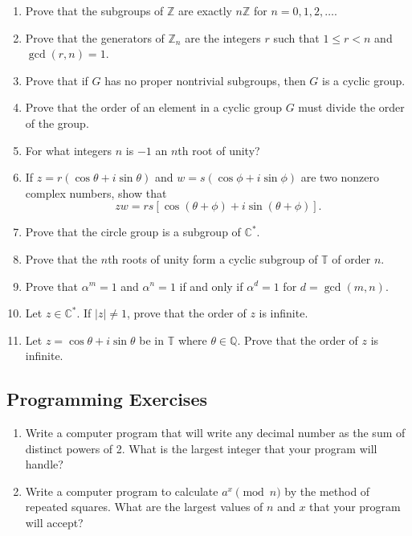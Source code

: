 {\begin{enumerate}
 
\item
Prove that the subgroups of ${\mathbb Z}$ are exactly $n{\mathbb Z}$ for $n
= 0, 1, 2, \ldots$. 
 
 
\item
Prove that the generators of ${\mathbb Z}_n$ are the integers $r$ such
that $1 \leq r < n$ and $\gcd(r,n) =  1$. 
 
 
\item
Prove that if $G$ has no proper nontrivial subgroups, then $G$ is a 
cyclic group.
 
 
 
\item
Prove that the order of an element in a cyclic group $G$ must divide
the order of the  group. 
 
 
\item
For what integers $n$ is $-1$ an $n$th root of unity?
 
 
\item
If $z = r( \cos \theta + i \sin \theta)$ and $w = s(\cos \phi + i \sin
\phi)$ are two nonzero complex numbers, show that
\[
zw = rs[ \cos( \theta + \phi)  + i \sin( \theta + \phi)].
\]
 
 
\item
Prove that the circle group is a subgroup of  ${\mathbb C}^*$.
 
 
\item
Prove that the $n$th roots of unity form a cyclic subgroup of ${\mathbb
T}$  of order $n$. 
 
 
\item
Prove that $\alpha^m =1$ and $\alpha^n = 1$ if and only if $\alpha^d = 1$
for $d = \gcd(m,n)$.
 
 
\item
Let $z \in {\mathbb C}^\ast$. If $|z| \neq 1$, prove that the order of
$z$ is infinite. 
 
 
\item
Let $z =\cos \theta + i \sin \theta$ be in ${\mathbb T}$ where $\theta
\in {\mathbb Q}$.  Prove that the order of $z$ is infinite.
 
\end{enumerate}
}
 
 
\subsection*{Programming Exercises}
 
 
{\small
\begin{enumerate}
 
 
\item
Write a computer program that will write any decimal number as the sum
of distinct powers of 2.  What is the largest integer that your
program will handle?
 
 
\item
Write a computer program to calculate $a^x \pmod{ n}$ by the method of
repeated squares.  What are the largest values of $n$ and $x$ that
your program will accept?  
 
 
\end{enumerate}
}
 
